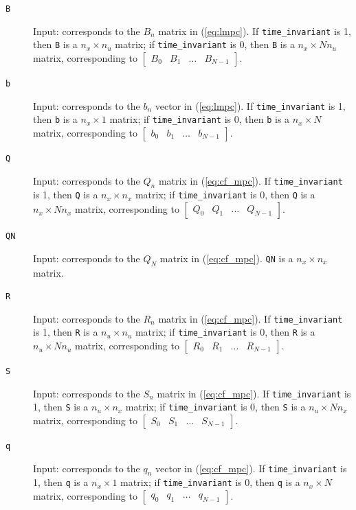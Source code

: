 \documentclass[a4paper]{report}
\begin{document}
\begin{description}
\item[\tt B] Input: corresponds to the $B_n$ matrix in (\ref{eq:lmpc}).
If {\tt time\_invariant} is 1, then {\tt B} is a $n_x\times n_u$ matrix; if {\tt time\_invariant} is 0, then {\tt B} is a $n_x\times Nn_u$ matrix, corresponding to $\begin{bmatrix} B_0 & B_1 & \dots & B_{N-1} \end{bmatrix}$.
\item[\tt b] Input: corresponds to the $b_n$ vector in (\ref{eq:lmpc}).
If {\tt time\_invariant} is 1, then {\tt b} is a $n_x\times 1$ matrix; if {\tt time\_invariant} is 0, then {\tt b} is a $n_x\times N$ matrix, corresponding to $\begin{bmatrix} b_0 & b_1 & \dots & b_{N-1} \end{bmatrix}$.
\item[\tt Q] Input: corresponds to the $Q_n$ matrix in (\ref{eq:cf_mpc}).
If {\tt time\_invariant} is 1, then {\tt Q} is a $n_x\times n_x$ matrix; if {\tt time\_invariant} is 0, then {\tt Q} is a $n_x\times Nn_x$ matrix, corresponding to $\begin{bmatrix} Q_0 & Q_1 & \dots & Q_{N-1} \end{bmatrix}$.

\item[\tt QN] Input: corresponds to the $Q_N$ matrix in (\ref{eq:cf_mpc}).
{\tt QN} is a $n_x\times n_x$ matrix.

\item[\tt R] Input: corresponds to the $R_n$ matrix in (\ref{eq:cf_mpc}).
If {\tt time\_invariant} is 1, then {\tt R} is a $n_u\times n_u$ matrix; if {\tt time\_invariant} is 0, then {\tt R} is a $n_u\times Nn_u$ matrix, corresponding to $\begin{bmatrix} R_0 & R_1 & \dots & R_{N-1} \end{bmatrix}$.

\item[\tt S] Input: corresponds to the $S_n$ matrix in (\ref{eq:cf_mpc}).
If {\tt time\_invariant} is 1, then {\tt S} is a $n_u\times n_x$ matrix; if {\tt time\_invariant} is 0, then {\tt S} is a $n_u\times Nn_x$ matrix, corresponding to $\begin{bmatrix} S_0 & S_1 & \dots & S_{N-1} \end{bmatrix}$.

\item[\tt q] Input: corresponds to the $q_n$ vector in (\ref{eq:cf_mpc}).
If {\tt time\_invariant} is 1, then {\tt q} is a $n_x\times 1$ matrix; if {\tt time\_invariant} is 0, then {\tt q} is a $n_x\times N$ matrix, corresponding to $\begin{bmatrix} q_0 & q_1 & \dots & q_{N-1} \end{bmatrix}$.


\end{description}
\end{document}
